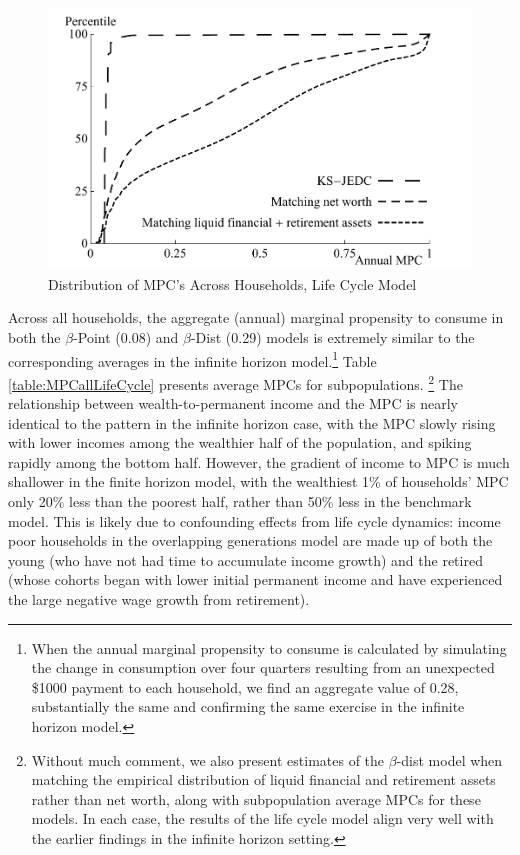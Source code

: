\documentclass{econtex}\usepackage[pdftex]{graphicx}\usepackage{epstopdf} \usepackage[pdftex]{hyperref}
\newcommand{\Discount}{\ensuremath{\beta}}
\begin{document}
\begin{figure}
\caption{Distribution of MPC's Across Households, Life Cycle Model}
\begin{center}
\includegraphics[scale=0.75]{../Figures/MPCdistributionLifeCyclePlot}
\end{center}
\end{figure}

Across all households, the aggregate (annual) marginal propensity to consume in both the \Discount-Point (0.08) and \Discount-Dist (0.29) models is extremely similar to the corresponding averages in the infinite horizon model.\footnote{When the annual marginal propensity to consume is calculated by simulating the change in consumption over four quarters resulting from an unexpected \$1000 payment to each household, we find an aggregate value of 0.28, substantially the same and confirming the same exercise in the infinite horizon model.}  Table \ref{table:MPCallLifeCycle} presents average MPCs for subpopulations.%
\footnote{Without much comment, we also present estimates of the \Discount-dist model when matching the empirical distribution of liquid financial and retirement assets rather than net worth, along with subpopulation average MPCs for these models.  In each case, the results of the life cycle model align very well with the earlier findings in the infinite horizon setting.}  The relationship between wealth-to-permanent income and the MPC is nearly identical to the pattern in the infinite horizon case, with the MPC slowly rising with lower incomes among the wealthier half of the population, and spiking rapidly among the bottom half.  However, the gradient of income to MPC is much shallower in the finite horizon model, with the wealthiest 1\% of households' MPC only 20\% less than the poorest half, rather than 50\% less in the benchmark model.  This is likely due to confounding effects from life cycle dynamics: income poor households in the overlapping generations model are made up of both the young (who have not had time to accumulate income growth) and the retired (whose cohorts began with lower initial permanent income and have experienced the large negative wage growth from retirement).
\end{document}
